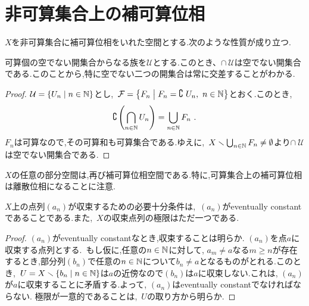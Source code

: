 \documentclass[uplatex, dvipdfmx, a4paper, 12pt, class=jsbook, crop=false]{standalone}
\begin{document}
\section{非可算集合上の補可算位相}
\label{ex:cocontable-topology}

\newcommand{\locref}[1]{\ref{LocalLabel-\thepart-\thechapter-\thesection:#1}}
\newcommand{\loclabel}[1]{\label{LocalLabel-\thepart-\thechapter-\thesection:#1}}

$X$を非可算集合に補可算位相をいれた空間とする.次のような性質が成り立つ.

\begin{property}
	\loclabel{property:5.a}
	可算個の空でない開集合からなる族を$\mathcal{U}$とする.このとき、$\cap\ \mathcal{U}$は空でない開集合である.このことから,特に空でない二つの開集合は常に交差することがわかる.
\end{property}

\begin{proof}
$\mathcal{U}=\setcomp{U_n}{n \in \N}$とし,\ $\mathcal{F}=\setcomp{F_n}{F_n = \complement \ U_n,\ n \in \N}$とおく.このとき,
$$\complement\left(\bigcap_{n \in \mathbb{N}} U_n\right)=\bigcup_{n\in\mathbb{N}}F_n\ .$$
$F_n$は可算なので,その可算和も可算集合である.ゆえに,\ $X\smallsetminus\bigcup_{n \in \mathbb{N}}F_n \neq \emptyset$より$\cap\ \mathcal{U}$は空でない開集合である.
\end{proof}

\begin{property}
	\loclabel{property:5.b}
	$X$の任意の部分空間は,再び補可算位相空間である.特に,可算集合上の補可算位相は離散位相になることに注意.
\end{property}

\begin{property}
	\loclabel{property:5.c}
	$X$上の点列$(a_n)$が収束するための必要十分条件は,\ $(a_n)$がeventually constantであることである.また,\ $X$の収束点列の極限はただ一つである.
\end{property}

\begin{proof}
$(a_n)$がeventually constantなとき,収束することは明らか.
$(a_n)$を点$a$に収束する点列とする.\ もし仮に,任意の$n \in \mathbb{N}$に対して, $a_m \neq a$なる$m \geq n$が存在するとき,部分列$(b_n)$で任意の$n \in \mathbb{N}$について$b_n \neq a$となるものがとれる.このとき,\ $U = X \setminus \setcomp{b_n}{n \in \N}$は$a$の近傍なので$(b_n)$は$a$に収束しない.これは, $(a_n)$が$a$に収束することに矛盾する.よって, $(a_n)$はeventually constantでなければならない.
極限が一意的であることは,\ $U$の取り方から明らか.
\end{proof}
\end{document}
